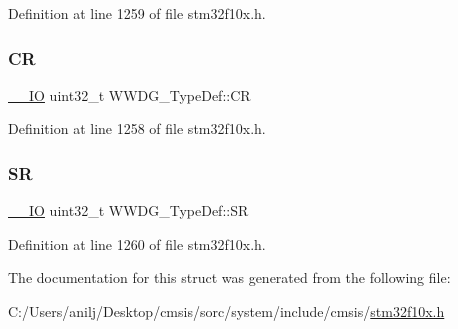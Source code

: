 Definition at line 1259 of file stm32f10x.\+h.

\mbox{\label{struct_w_w_d_g___type_def_a4caf530d45f7428c9700d9c0057135f8}} 
\subsubsection{\texorpdfstring{CR}{CR}}
{\footnotesize\ttfamily \hyperlink{core__sc300_8h_aec43007d9998a0a0e01faede4133d6be}{\+\_\+\+\_\+\+IO} uint32\+\_\+t W\+W\+D\+G\+\_\+\+Type\+Def\+::\+CR}



Definition at line 1258 of file stm32f10x.\+h.

\mbox{\label{struct_w_w_d_g___type_def_a15655cda4854cc794db1f27b3c0bba38}} 
\subsubsection{\texorpdfstring{SR}{SR}}
{\footnotesize\ttfamily \hyperlink{core__sc300_8h_aec43007d9998a0a0e01faede4133d6be}{\+\_\+\+\_\+\+IO} uint32\+\_\+t W\+W\+D\+G\+\_\+\+Type\+Def\+::\+SR}



Definition at line 1260 of file stm32f10x.\+h.



The documentation for this struct was generated from the following file\+:\begin{DoxyCompactItemize}
\item 
C\+:/\+Users/anilj/\+Desktop/cmsis/sorc/system/include/cmsis/\hyperlink{stm32f10x_8h}{stm32f10x.\+h}\end{DoxyCompactItemize}
